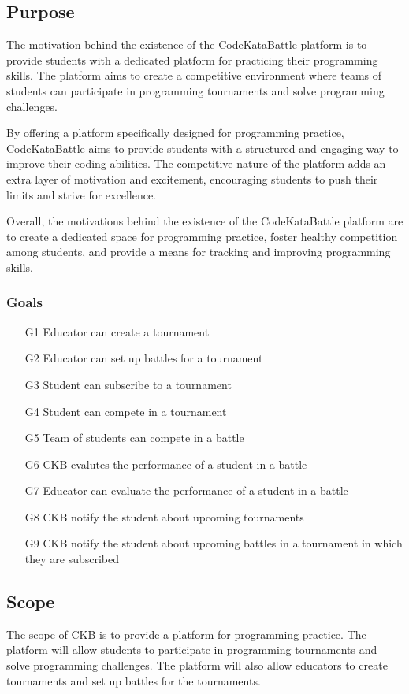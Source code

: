 \subsection{Purpose}
The motivation behind the existence of the CodeKataBattle platform is to provide students with a dedicated platform for practicing their programming skills. The platform aims to create a competitive environment where teams of students can participate in programming tournaments and solve programming challenges.

By offering a platform specifically designed for programming practice, CodeKataBattle aims to provide students with a structured and engaging way to improve their coding abilities. The competitive nature of the platform adds an extra layer of motivation and excitement, encouraging students to push their limits and strive for excellence.

Overall, the motivations behind the existence of the CodeKataBattle platform are to create a dedicated space for programming practice, foster healthy competition among students, and provide a means for tracking and improving programming skills.

\subsubsection{Goals}
\begin{enumerate}
    \item[G1] Educator can create a tournament
    \item[G2] Educator can set up battles for a tournament
    \item[G3] Student can subscribe to a tournament
    \item[G4] Student can compete in a tournament
    \item[G5] Team of students can compete in a battle
    \item[G6] CKB evalutes the performance of a student in a battle
    \item[G7] Educator can evaluate the performance of a student in a battle
    \item[G8] CKB notify the student about upcoming tournaments
    \item[G9] CKB notify the student about upcoming battles in a tournament in which they are subscribed
\end{enumerate}

\subsection{Scope}
The scope of CKB is to provide a platform for programming practice. The platform will allow students to participate in programming tournaments and solve programming challenges. The platform will also allow educators to create tournaments and set up battles for the tournaments.